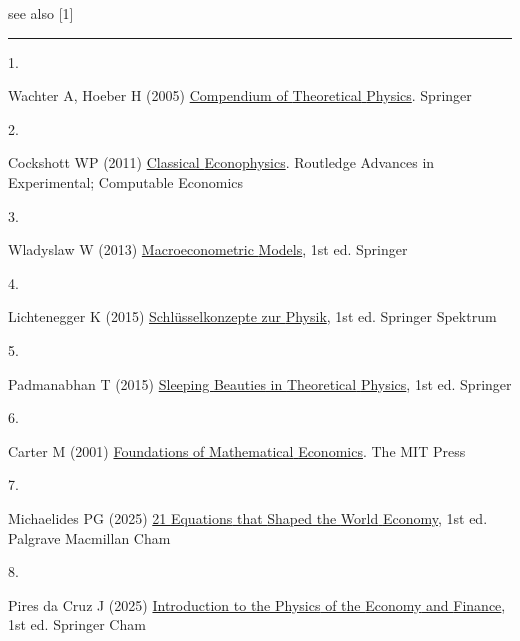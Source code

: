 \documentclass[
  letterpaper,
  DIV=11,
  numbers=noendperiod]{scrartcl}
\newlength{\cslhangindent}
\newlength{\csllabelwidth}
\newenvironment{CSLReferences}[2] %
 {\begin{list}{}{%
  \setlength{\itemindent}{0pt}
  \setlength{\leftmargin}{0pt}
  \setlength{\parsep}{0pt}
  \ifodd #1
   \setlength{\leftmargin}{\cslhangindent}
   \setlength{\itemindent}{-1\cslhangindent}
  \fi
  \setlength{\itemsep}{#2\baselineskip}}}
 {\end{list}}
\newcommand{\CSLLeftMargin}[1]{\parbox[t]{\csllabelwidth}{\strut#1\strut}}
\newcommand{\CSLRightInline}[1]{\parbox[t]{\linewidth - \csllabelwidth}{\strut#1\strut}}
\begin{document}
\hfill\break
\hfill\break

see also {[}1{]}

\begin{center}\rule{0.5\linewidth}{0.5pt}\end{center}

\label{refs}
\begin{CSLReferences}{0}{1}
\CSLLeftMargin{1. }%
\CSLRightInline{Wachter A, Hoeber H (2005)
\href{https://link.springer.com/book/10.1007/0-387-29198-9}{Compendium
of {Theoretical} {Physics}}. Springer}

\CSLLeftMargin{2. }%
\CSLRightInline{Cockshott WP (2011)
\href{https://www.routledge.com/Classical-Econophysics/Cottrell-Cockshott-Michaelson-Wright-Yakovenko/p/book/9780415696463}{Classical
{Econophysics}}. Routledge Advances in Experimental; Computable
Economics}

\CSLLeftMargin{3. }%
\CSLRightInline{Wladyslaw W (2013)
\href{https://link.springer.com/book/10.1007/978-3-642-34468-8}{Macroeconometric
{Models}}, 1st ed. Springer}

\CSLLeftMargin{4. }%
\CSLRightInline{Lichtenegger K (2015)
\href{https://link.springer.com/book/10.1007/978-3-8274-2385-6}{Schlüsselkonzepte
zur {Physik}}, 1st ed. Springer Spektrum}

\CSLLeftMargin{5. }%
\CSLRightInline{Padmanabhan T (2015)
\href{https://link.springer.com/book/10.1007/978-3-319-13443-7}{Sleeping
{Beauties} in {Theoretical} {Physics}}, 1st ed. Springer}

\CSLLeftMargin{6. }%
\CSLRightInline{Carter M (2001)
\href{https://mitpress.mit.edu/9780262531924/foundations-of-mathematical-economics/}{Foundations
of {Mathematical} {Economics}}. The MIT Press}

\CSLLeftMargin{7. }%
\CSLRightInline{Michaelides PG (2025)
\href{https://link.springer.com/book/10.1007/978-3-031-76140-9}{21
{Equations} that {Shaped} the {World} {Economy}}, 1st ed. Palgrave
Macmillan Cham}

\CSLLeftMargin{8. }%
\CSLRightInline{Pires da Cruz J (2025)
\href{https://link.springer.com/book/10.1007/978-3-032-04346-7}{Introduction
to the {Physics} of the {Economy} and {Finance}}, 1st ed. Springer Cham}


\end{CSLReferences}
\end{document}
